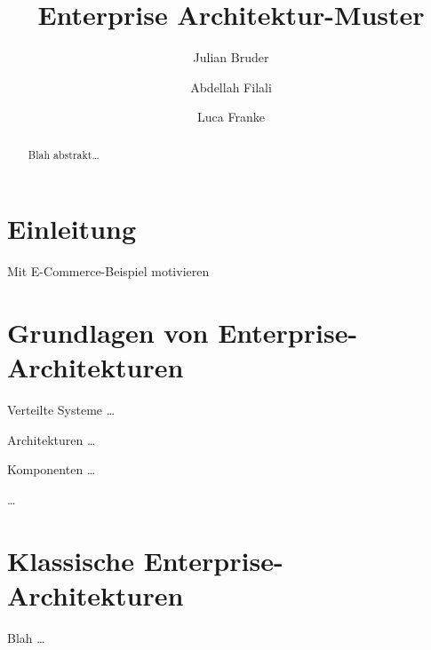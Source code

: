 \documentclass[acmtog]{acmart}
\begin{document}
\title{Enterprise Architektur-Muster}

\author{Julian Bruder}
\author{Abdellah Filali}
\authornotemark[1]
\author{Luca Franke}
\authornotemark[1]
\renewcommand{\shortauthors}{Bruder, Filali, Franke}

\begin{abstract}
Blah abstrakt\ldots
\end{abstract}

\maketitle

\section{Einleitung}
Mit E-Commerce-Beispiel motivieren

\section{Grundlagen von Enterprise-Architekturen}
Verteilte Systeme \ldots

Architekturen \ldots

Komponenten \ldots

\ldots


\section{Klassische Enterprise-Architekturen}
Blah \ldots
\end{document}
